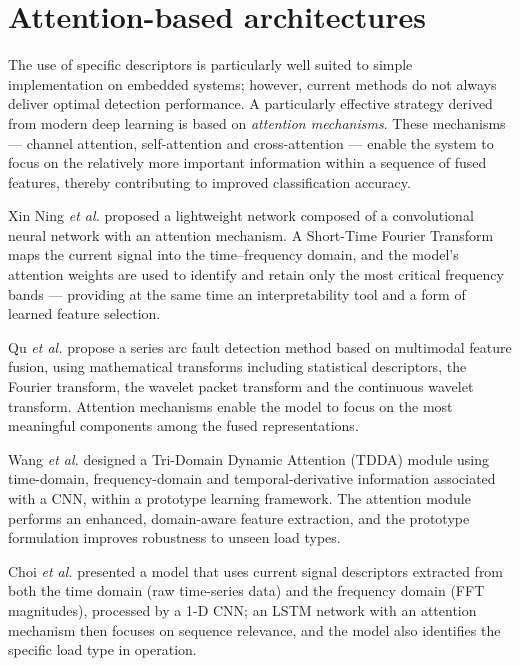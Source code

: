 \section{Attention-based architectures}
\label{sec:sota-attention}

The use of specific descriptors is particularly well suited to simple implementation on embedded systems; however, current methods do not always deliver optimal detection performance. A particularly effective strategy derived from modern deep learning is based on \emph{attention mechanisms}. These mechanisms --- channel attention, self-attention and cross-attention --- enable the system to focus on the relatively more important information within a sequence of fused features, thereby contributing to improved classification accuracy.

\medskip

Xin Ning \emph{et al.} \cite{ning2024interp} proposed a lightweight network composed of a convolutional neural network with an attention mechanism. A Short-Time Fourier Transform maps the current signal into the time--frequency domain, and the model's attention weights are used to identify and retain only the most critical frequency bands --- providing at the same time an interpretability tool and a form of learned feature selection.

\medskip

Qu \emph{et al.} \cite{qu2023multimodal} propose a series arc fault detection method based on multimodal feature fusion, using mathematical transforms including statistical descriptors, the Fourier transform, the wavelet packet transform and the continuous wavelet transform. Attention mechanisms enable the model to focus on the most meaningful components among the fused representations.

\medskip

Wang \emph{et al.} \cite{wang2026tdda} designed a Tri-Domain Dynamic Attention (TDDA) module using time-domain, frequency-domain and temporal-derivative information associated with a CNN, within a prototype learning framework. The attention module performs an enhanced, domain-aware feature extraction, and the prototype formulation improves robustness to unseen load types.

\medskip

Choi \emph{et al.} \cite{choi2024feature} presented a model that uses current signal descriptors extracted from both the time domain (raw time-series data) and the frequency domain (FFT magnitudes), processed by a 1-D CNN; an LSTM network with an attention mechanism then focuses on sequence relevance, and the model also identifies the specific load type in operation.

